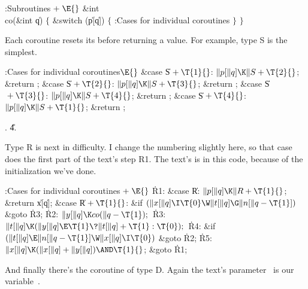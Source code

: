 \Y\B\4:Subroutines\X${}\mathrel+\E{}$\6
\&{int} \\{co}(\&{int} \|q)\1\1\2\2\6
${}\{{}$\1\6
\&{switch} (\|p[\|q])\5
${}\{{}$\1\6
:Cases for individual coroutines\X\6
\4${}\}{}$\2\6
\4${}\}{}$\2\par
\fi

Each coroutine resets its  before returning a
value.
For example, type S is the simplest.

\Y\B\4:Cases for individual coroutines\X${}\E{}$\6
\4\&{case} \|S${}+\T{1}{}$:\5
${}\|p[\|q]\K\|S+\T{2}{}$;\5
\&{return} ;\6
\4\&{case} \|S${}+\T{2}{}$:\5
${}\|p[\|q]\K\|S+\T{3}{}$;\5
\&{return} ;\6
\4\&{case} \|S${}+\T{3}{}$:\5
${}\|p[\|q]\K\|S+\T{4}{}$;\5
\&{return} ;\6
\4\&{case} \|S${}+\T{4}{}$:\5
${}\|p[\|q]\K\|S+\T{1}{}$;\5
\&{return} ;\par
{}.
\U4.\fi

Type R is next in difficulty. I change the numbering
slightly here,
so that case  does the first part of the text's step R1.
The text's  is  in this code, because of the
initialization we've done.

\Y\B\4:Cases for individual coroutines\X${}\mathrel+\E{}$\6
\4\.{R1}:\5
\&{case} \|R:\5
${}\|p[\|q]\K\|R+\T{1}{}$;\5
\&{return} \|x[\|q];\6
\4\&{case} \|R${}+\T{1}{}$:\5
\&{if} ${}(\|x[\|q]\I\T{0}\W\|t[\|q]\G\|n[\|q-\T{1}]){}$\1\5
\&{goto} \.{R3};\2\6
\4\.{R2}:\5
${}\|y[\|q]\K\\{co}(\|q-\T{1});{}$\6
\4\.{R3}:\5
${}\|t[\|q]\K(\|y[\|q]\E\T{1}\?\|t[\|q]+\T{1}:\T{0});{}$\6
\4\.{R4}:\5
\&{if} ${}(\|t[\|q]\E\|n[\|q-\T{1}]\W\|x[\|q]\I\T{0}){}$\1\5
\&{goto} \.{R2};\2\6
\4\.{R5}:\5
${}\|x[\|q]\K(\|x[\|q]+\|y[\|q])\AND\T{1}{}$;\5
\&{goto} \.{R1};\par
\fi

And finally there's the coroutine of type D. Again the
text's parameter~
is our variable~.


